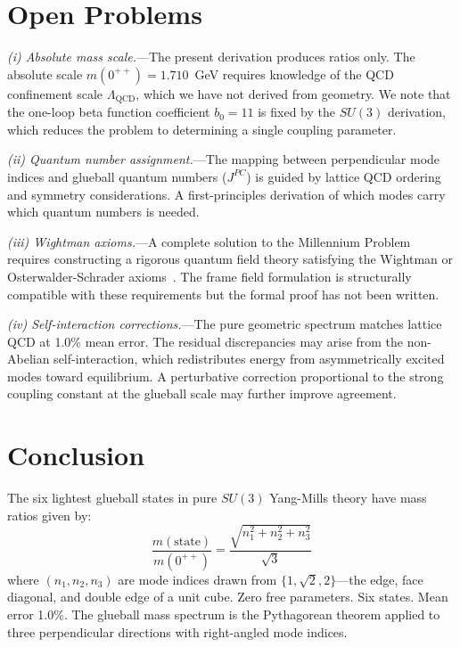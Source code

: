 \documentclass[aps,prd,twocolumn,superscriptaddress,nofootinbib]{revtex4-2}
\begin{document}
\section{Open Problems}
\label{sec:open}

\textit{(i) Absolute mass scale.}---The present derivation produces
ratios only. The absolute scale $m(0^{++}) = 1.710$~GeV requires
knowledge of the QCD confinement scale $\Lambda_{\text{QCD}}$, which
we have not derived from geometry. We note that the one-loop beta
function coefficient $b_0 = 11$ is fixed by the $SU(3)$ derivation,
which reduces the problem to determining a single coupling parameter.

\textit{(ii) Quantum number assignment.}---The mapping between
perpendicular mode indices and glueball quantum numbers ($J^{PC}$) is
guided by lattice QCD ordering and symmetry considerations. A
first-principles derivation of which modes carry which quantum numbers
is needed.

\textit{(iii) Wightman axioms.}---A complete solution to the
Millennium Problem requires constructing a rigorous quantum field
theory satisfying the Wightman or Osterwalder-Schrader
axioms~\cite{Jaffe2000}. The frame field formulation is structurally
compatible with these requirements but the formal proof has not been
written.

\textit{(iv) Self-interaction corrections.}---The pure geometric
spectrum matches lattice QCD at 1.0\% mean error. The residual
discrepancies may arise from the non-Abelian self-interaction, which
redistributes energy from asymmetrically excited modes toward
equilibrium. A perturbative correction proportional to the strong
coupling constant at the glueball scale may further improve agreement.

\section{Conclusion}
\label{sec:conclusion}

The six lightest glueball states in pure $SU(3)$ Yang-Mills theory
have mass ratios given by:
\begin{equation}
\frac{m(\text{state})}{m(0^{++})} =
\frac{\sqrt{n_1^2 + n_2^2 + n_3^2}}{\sqrt{3}}
\label{eq:main}
\end{equation}
where $(n_1, n_2, n_3)$ are mode indices drawn from
$\{1, \sqrt{2}, 2\}$---the edge, face diagonal, and double edge of a
unit cube. Zero free parameters. Six states. Mean error 1.0\%. The
glueball mass spectrum is the Pythagorean theorem applied to three
perpendicular directions with right-angled mode indices.
\end{document}
